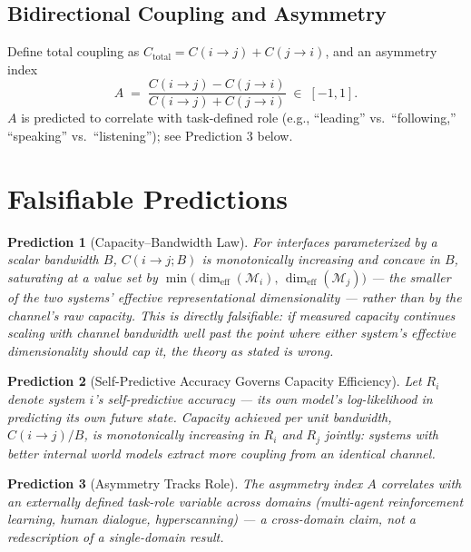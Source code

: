 \documentclass[11pt]{article}
\newtheorem{prediction}{Prediction}
\begin{document}
\subsection{Bidirectional Coupling and Asymmetry}

Define total coupling as $C_{\text{total}} = C(i \to j) + C(j \to i)$, and an asymmetry index
\begin{equation}
A \;=\; \frac{C(i \to j) - C(j \to i)}{C(i \to j) + C(j \to i)} \;\in\; [-1, 1].
\end{equation}
$A$ is predicted to correlate with task-defined role (e.g., ``leading'' vs.\ ``following,'' ``speaking'' vs.\ ``listening''); see Prediction 3 below.

\section{Falsifiable Predictions}

\begin{prediction}[Capacity--Bandwidth Law]
For interfaces parameterized by a scalar bandwidth $B$, $C(i \to j; B)$ is monotonically increasing and concave in $B$, saturating at a value set by $\min\big(\dim_{\mathrm{eff}}(\mathcal{M}_i),\, \dim_{\mathrm{eff}}(\mathcal{M}_j)\big)$ --- the smaller of the two systems' \emph{effective} representational dimensionality --- rather than by the channel's raw capacity. This is directly falsifiable: if measured capacity continues scaling with channel bandwidth well past the point where either system's effective dimensionality should cap it, the theory as stated is wrong.
\end{prediction}

\begin{prediction}[Self-Predictive Accuracy Governs Capacity Efficiency]
Let $R_i$ denote system $i$'s self-predictive accuracy --- its own model's log-likelihood in predicting its own future state. Capacity achieved per unit bandwidth, $C(i \to j)/B$, is monotonically increasing in $R_i$ and $R_j$ jointly: systems with better internal world models extract more coupling from an identical channel.
\end{prediction}

\begin{prediction}[Asymmetry Tracks Role]
The asymmetry index $A$ correlates with an externally defined task-role variable across domains (multi-agent reinforcement learning, human dialogue, hyperscanning) --- a cross-domain claim, not a redescription of a single-domain result.
\end{prediction}
\end{document}
